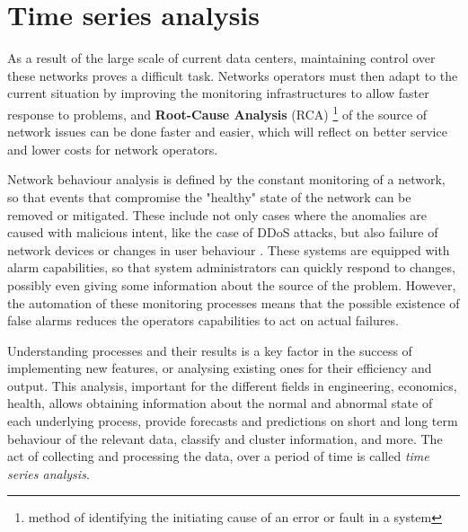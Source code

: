 \section{Time series analysis} \label{chap:stat_det}

As a result of the large scale of current data centers, maintaining control over these networks proves a difficult task. Networks operators must then adapt to the
current situation by improving the monitoring infrastructures to allow faster response to problems, and \textbf{Root-Cause Analysis} (RCA) \footnote{method of
identifying the initiating cause of an error or fault in a system} of the source of network issues can be done faster and easier, which will reflect on better 
service and lower costs for network operators. 

\par Network behaviour analysis is defined by the constant monitoring of a network, so that events that compromise the "healthy" state of the network can be
removed or mitigated. These include not only cases where the anomalies are caused with malicious intent, like the case of DDoS attacks, but also failure of network 
devices or changes in user behaviour \cite{munz_traffic_2010}. These systems are equipped with alarm capabilities, so that system administrators can quickly respond
to changes, possibly even giving some information about the source of the problem. However, the automation of these monitoring processes means that the possible 
existence of false alarms reduces the operators capabilities to act on actual failures. 

Understanding processes and their results is a key factor in the success of implementing new features, or analysing existing ones for their efficiency and output.
This analysis, important for the different fields in engineering, economics, health, allows obtaining information about the normal and abnormal state of each 
underlying process, provide forecasts and predictions on short and long term behaviour of the relevant data, classify and cluster information, and more. The act of 
collecting and processing the data, over a period of time is called \textit{time series analysis}. 

